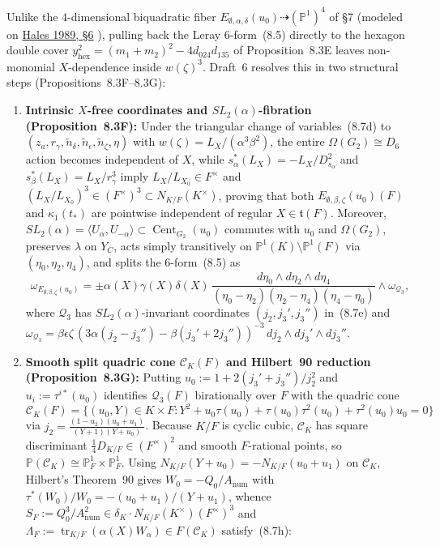 \documentclass[11pt,letterpaper]{article}
\DeclareMathOperator{\Cent}{Cent}
\DeclareMathOperator{\tr}{tr}
\begin{document}
Unlike the $4$-dimensional biquadratic fiber $E_{\emptyset,\alpha,\delta}(u_0)\dashrightarrow(\mathbb{P}^1)^4$ of \S7 (modeled on \href{https://www.numdam.org/article/AST_1989__171-172__195_0.pdf}{Hales 1989, \S6} \cite{Ha89}), pulling back the Leray $6$-form~(8.5) directly to the hexagon double cover $y_{\mathrm{hex}}^2=(m_1+m_2)^2-4d_{024}d_{135}$ of Proposition~8.3E leaves non-monomial $X$-dependence inside $w(\zeta)^3$. Draft~6 resolves this in two structural steps (Propositions~8.3F--8.3G):
\begin{enumerate}[1.]
\item \textbf{Intrinsic $X$-free coordinates and $SL_2(\alpha)$-fibration (Proposition~8.3F):} Under the triangular change of variables~(8.7d) to $(z_a,r_\gamma,\tilde n_\delta,\tilde n_\epsilon,\tilde n_\zeta,\eta)$ with $w(\zeta)=L_X/(\alpha^3\beta^2)$, the entire $\Omega(G_2)\cong D_6$ action becomes independent of $X$, while $s_\alpha^*(L_X)=-L_X/D_{s_\alpha}^2$ and $s_\beta^*(L_X)=L_X/r_\gamma^3$ imply $L_X/L_{X_0}\in F^\times$ and $(L_X/L_{X_0})^3\in(F^\times)^3\subset N_{K/F}(K^\times)$, proving that both $E_{\emptyset,\beta,\zeta}(u_0)(F)$ and $\kappa_1(t_*)$ are pointwise independent of regular $X\in\mathfrak t(F)$. Moreover, $SL_2(\alpha)=\langle U_\alpha,U_{-\alpha}\rangle\subset\Cent_{G_2}(u_0)$ commutes with $u_0$ and $\Omega(G_2)$, preserves $\lambda$ on $Y_C$, acts simply transitively on $\mathbb{P}^1(K)\setminus\mathbb{P}^1(F)$ via $(\eta_0,\eta_2,\eta_4)$, and splits the $6$-form~(8.5) as
\[
\omega_{E_{\emptyset,\beta,\zeta}(u_0)}=\pm\alpha(X)\gamma(X)\delta(X)\,
\frac{d\eta_0\wedge d\eta_2\wedge d\eta_4}{(\eta_0-\eta_2)(\eta_2-\eta_4)(\eta_4-\eta_0)}
\wedge\omega_{\mathcal{Q}_3},
\]
where $\mathcal{Q}_3$ has $SL_2(\alpha)$-invariant coordinates $(j_2,j_3',j_3'')$ in~(8.7e) and $\omega_{\mathcal{Q}_3}=\beta\epsilon\zeta\,(3\alpha(j_2-j_3'')-\beta(j_3'+2j_3''))^{-3}\,dj_2\wedge dj_3'\wedge dj_3''$.
\item \textbf{Smooth split quadric cone $\mathcal{C}_K(F)$ and Hilbert~90 reduction (Proposition~8.3G):} Putting $u_0:=1+2(j_3'+j_3'')/j_2^2$ and $u_i:=\tau^{i*}(u_0)$ identifies $\mathcal{Q}_3(F)$ birationally over $F$ with the quadric cone
\[
\mathcal{C}_K(F)=\bigl\{(u_0,Y)\in K\times F : Y^2+u_0\tau(u_0)+\tau(u_0)\tau^2(u_0)+\tau^2(u_0)u_0=0\bigr\}
\]
via $j_2=\frac{(1-u_2)(u_0+u_1)}{(Y+1)(Y+u_0)}$. Because $K/F$ is cyclic cubic, $\mathcal{C}_K$ has square discriminant $\frac14 D_{K/F}\in(F^\times)^2$ and smooth $F$-rational points, so $\mathbb{P}(\mathcal{C}_K)\cong\mathbb{P}^1_F\times\mathbb{P}^1_F$. Using $N_{K/F}(Y+u_0)=-N_{K/F}(u_0+u_1)$ on $\mathcal{C}_K$, Hilbert's Theorem~90 gives $W_0=-Q_0/A_{\mathrm{num}}$ with $\tau^*(W_0)/W_0=-(u_0+u_1)/(Y+u_1)$, whence $S_F:=Q_0^3/A_{\mathrm{num}}^2\in\delta_K\cdot N_{K/F}(K^\times)(F^\times)^3$ and $\Lambda_F:=\tr_{K/F}(\alpha(X)W_\alpha)\in F(\mathcal{C}_K)$ satisfy~(8.7h):

\end{enumerate}
\end{document}
